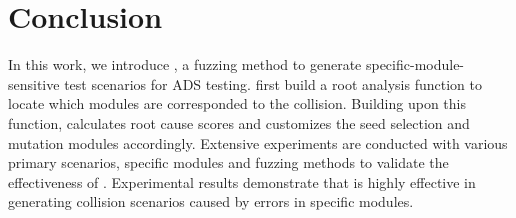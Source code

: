 \section{Conclusion}\label{sec: Conclusion}

In this work, we introduce \abb{}, a fuzzing method to generate specific-module-sensitive test scenarios for ADS testing.
\abb{} first build a root analysis function to locate which modules are corresponded to the collision. Building upon this function, \abb{} calculates root cause scores and customizes the seed selection and mutation modules accordingly. 
Extensive experiments are conducted with various primary scenarios, specific modules and fuzzing methods to validate the effectiveness of \abb{}. Experimental results demonstrate that \abb{} is highly effective in generating collision scenarios caused by errors in specific modules.

